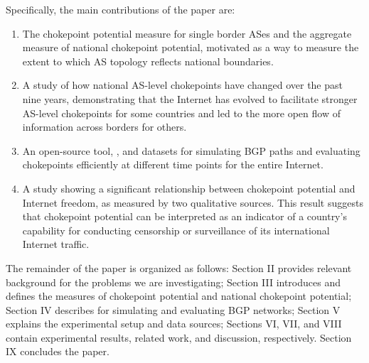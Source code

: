 






\par
Specifically, the main contributions of the paper are: 
\begin{enumerate}
 \item The chokepoint potential measure for single border ASes and the 
 aggregate measure of national chokepoint potential, motivated as a way to measure the extent to which AS topology reflects national boundaries.

 \item A study of how national AS-level chokepoints have changed over the past nine years, demonstrating that the Internet has evolved to facilitate stronger
 AS-level chokepoints for some countries and led to the more open flow of information across borders for others.
 \item An open-source tool, \toolname{}, and datasets for simulating BGP paths and evaluating chokepoints efficiently at different time points for the entire Internet.  
 \item A study showing a significant relationship between chokepoint potential and Internet freedom, as measured by two qualitative sources.  This result suggests that chokepoint potential can be interpreted as an indicator of a country's capability for conducting censorship or surveillance of its international Internet traffic.
\end{enumerate}


\par
The remainder of the paper is organized as follows: Section II provides relevant background for
the problems we are investigating; Section III introduces and defines the measures of chokepoint
potential and national chokepoint potential; Section IV describes \toolname{} for simulating and evaluating 
BGP networks; Section V
explains the experimental setup and data sources; Sections VI, VII, and VIII contain experimental results, related work, and discussion,
respectively.  Section IX concludes the paper.
